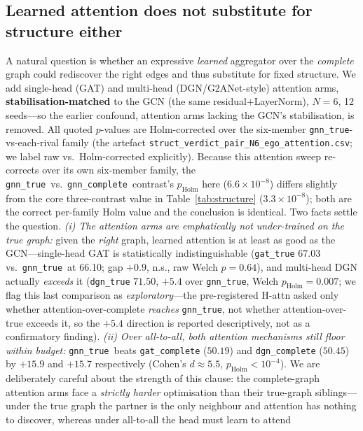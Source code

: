 \documentclass[manuscript, screen, review]{jair}
\newcommand{\gtrue}{\texttt{gnn\_true}}
\newcommand{\gcomplete}{\texttt{gnn\_complete}}
\newcommand{\SCtrueN}{66.10}          %
\newcommand{\SCgatComplete}{50.19}    %
\newcommand{\SCdgnComplete}{50.45}    %
\newcommand{\SCgatTrue}{67.03}        %
\newcommand{\SCgatTrueGap}{+0.9}      %
\newcommand{\SCgatTrueP}{0.64}        %
\newcommand{\SCtrueGatCompGap}{+15.9} %
\newcommand{\SCtrueDgnCompGap}{+15.7} %
\newcommand{\SCtrueAttCompD}{5.5}     %
\begin{document}
\subsection{Learned attention does not substitute for structure either}
\label{sec:structure:attention}

A natural question is whether an expressive \emph{learned} aggregator over the
\emph{complete} graph could rediscover the right edges and thus substitute for
fixed structure. We add single-head (GAT) and multi-head (DGN/G2ANet-style)
attention arms, \textbf{stabilisation-matched} to the GCN (the same
residual$+$LayerNorm), $N{=}6$, 12 seeds---so the earlier confound, attention
arms lacking the GCN's stabilisation, is removed. All quoted $p$-values are
Holm-corrected over the six-member \gtrue-vs-each-rival family (the artefact
\texttt{struct\_verdict\_pair\_N6\_ego\_attention.csv}; we label raw vs.\
Holm-corrected explicitly). Because this attention sweep re-corrects over its
own six-member family, the \gtrue\ vs.\ \gcomplete\ contrast's $p_{\text{Holm}}$
here ($6.6\times10^{-8}$) differs slightly from the core three-contrast value in
Table~\ref{tab:structure} ($3.3\times10^{-8}$); both are the correct per-family
Holm value and the conclusion is identical. Two facts settle the
question. \emph{(i) The attention arms are emphatically not under-trained on the
true graph:} given the
\emph{right} graph, learned attention is at least as good as the GCN---single-head
GAT is statistically indistinguishable (\texttt{gat\_true} $\SCgatTrue$ vs.\
\gtrue\ at \SCtrueN; gap $\SCgatTrueGap$, n.s., raw Welch $p=\SCgatTrueP$), and
multi-head DGN actually \emph{exceeds} it (\texttt{dgn\_true} $71.50$, $+5.4$ over
\gtrue, Welch $p_{\text{Holm}}=0.007$; we flag this last comparison as
\emph{exploratory}---the pre-registered H-attn asked only whether
attention-over-complete \emph{reaches} \gtrue, not whether attention-over-true
exceeds it, so the $+5.4$ direction is reported descriptively, not as a
confirmatory finding). \emph{(ii) Over
all-to-all, both attention mechanisms still floor within budget:} \gtrue\ beats
\texttt{gat\_complete} ($\SCgatComplete$) and \texttt{dgn\_complete}
($\SCdgnComplete$) by $\SCtrueGatCompGap$ and $\SCtrueDgnCompGap$
respectively (Cohen's $d{\approx}\SCtrueAttCompD$, $p_{\text{Holm}}<10^{-4}$).
We are deliberately careful about the strength of this clause: the complete-graph
attention arms face a \emph{strictly harder} optimisation than their true-graph
siblings---under the true graph the partner is the only neighbour and attention
has nothing to discover, whereas under all-to-all the head must learn to attend
\end{document}

